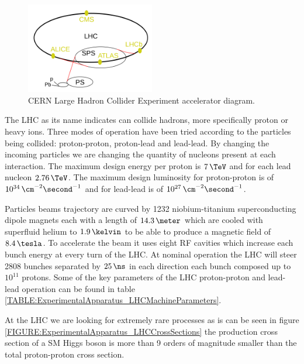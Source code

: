 \begin{figure}[!htb]
  \centering
  \includegraphics[width=0.50\textwidth]{Chapter02/LHC/Images/LHCAccelaratorChain.png}
  \caption{CERN Large Hadron Collider Experiment accelerator diagram.}
  \label{FIGURE:ExperimentalApparatus_LHCAccelaratorChain}
\end{figure}


The \gls{LHC} as its name indicates can collide hadrons, more specifically proton or heavy ions. Three modes of operation have been tried according to the particles being collided: proton-proton, proton-lead and lead-lead. By changing the incoming particles we are changing the quantity of nucleons present at each interaction. The maximum design energy per proton is $7\,\TeV$ and for each lead nucleon $2.76\,\TeV$. The maximum design luminosity for proton-proton is of $10^{34}\,\cm^{-2}\second^{-1}$ and for lead-lead is of $10^{27}\,\cm^{-2}\second^{-1}$.

Particles beams trajectory are curved by 1232 niobium-titanium superconducting dipole magnets each with a length of $14.3\,\meter$ which are cooled with superfluid helium to $1.9\,\kelvin$ to be able to produce a magnetic field of $8.4\,\tesla$. To accelerate the beam it uses eight \gls{RF} cavities which increase each bunch energy at every turn of the \gls{LHC}. At nominal operation the \gls{LHC} will steer 2808 bunches separated by $25\,\ns$ in each direction each bunch composed up to $10^{11}$ protons. Some of the key parameters of the \gls{LHC} proton-proton and lead-lead operation can be found in table \ref{TABLE:ExperimentalApparatus_LHCMachineParameters}.



At the \gls{LHC} we are looking for extremely rare processes as is can be seen in figure \ref{FIGURE:ExperimentalApparatus_LHCCrossSections} the production cross section of a \gls{SM} Higgs boson is more than 9 orders of magnitude smaller than the total proton-proton cross section. 

